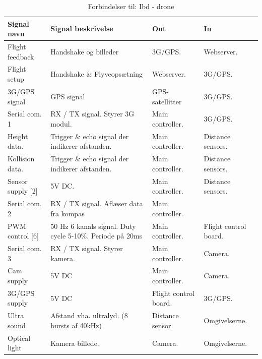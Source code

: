 \begin{table}[H]
	\centering
		\begin{tabular}{|p{2.6 cm}|p{4.9 cm}|p{2.5 cm}|p{2.5 cm}|}  
		\hline
			\textbf{Signal navn} 	& \textbf{Signal beskrivelse}		& \textbf{Out} 		& \textbf{In}     \\ \hline
			Flight feedback		& Handshake og billeder				& 3G/GPS.			& Webserver.	\\ \hline
			Flight setup		& Handshake \& Flyveopsætning  		& Webserver.			& 3G/GPS.	\\ \hline
			3G/GPS signal 		& GPS signal	& GPS-satellitter				& 3G/GPS.	\\ \hline			
			Serial com. 1		& RX / TX signal. Styrer 3G modul. 	& Main controller. 	& 3G/GPS.    \\ \hline
			Height data.		& Trigger \& echo signal der indikerer afstanden. 	& Main controller.	& Distance sensors.	\\ \hline
			Kollision data.		& Trigger \& echo signal der indikerer afstanden. 	& Main controller.	& Distance sensors.  \\ \hline
			Sensor supply [2]	& 5V DC.	& Main controller. & Distance sensors.	\\ \hline
			Serial com. 2		& RX / TX signal. Aflæser data fra kompas & Main controller.				& 	\\ \hline 
			PWM control [6]		& 50 Hz 6 kanals signal. Duty cycle 5-10\%. Periode på 20ms	& Main controller.				& Flight control board.	\\ \hline
			Serial com. 3		& RX / TX signal. Styrer kamera.	& Main controller.	& Camera.	\\ \hline
			Cam supply			& 5V DC 	& Main controller.	& Camera.	\\ \hline
			3G/GPS supply		& 5V DC  	& Flight control board.	& 3G/GPS.	\\ \hline
			Ultra sound			& Afstand vha. ultralyd. (8 bursts af 40kHz) 	& Distance sensor.	& Omgivelserne.	\\ \hline
			Optical light		& Kamera billede. 	& Camera.	& Omgivelserne.	\\ \hline			 
		\end{tabular}
	\caption{Forbindelser til: Ibd - drone}
	\label{tab:IBDdrone}
\end{table}

